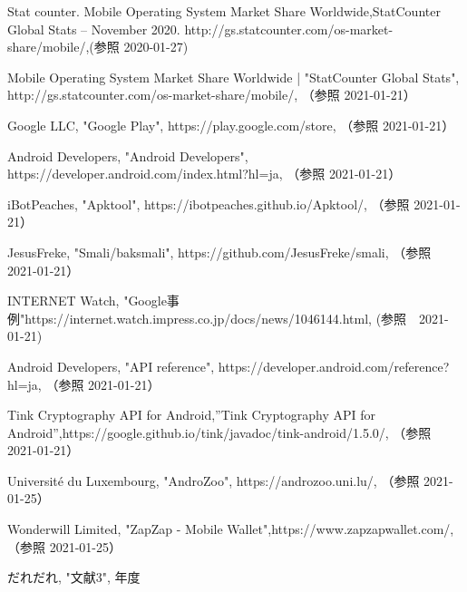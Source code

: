 \newpage
\begin{thebibliography}{99}

Stat counter. Mobile Operating System Market Share Worldwide,StatCounter Global Stats – November 2020. http://gs.statcounter.com/os-market-share/mobile/,(参照 2020-01-27)

Mobile Operating System Market Share Worldwide |  "StatCounter Global Stats",
http://gs.statcounter.com/os-market-share/mobile/, （参照 2021-01-21）

Google LLC, "Google Play", https://play.google.com/store, （参照 2021-01-21）

Android Developers, "Android Developers", https://developer.android.com/index.html?hl=ja, （参照 2021-01-21）

iBotPeaches, "Apktool", https://ibotpeaches.github.io/Apktool/, （参照 2021-01-21）

JesusFreke, "Smali/baksmali", https://github.com/JesusFreke/smali, （参照 2021-01-21）


INTERNET Watch, "Google事例"https://internet.watch.impress.co.jp/docs/news/1046144.html, (参照　2021-01-21)

Android Developers, "API reference", https://developer.android.com/reference?hl=ja, （参照 2021-01-21）

Tink Cryptography API for Android,''Tink Cryptography API for Android'',https://google.github.io/tink/javadoc/tink-android/1.5.0/, （参照 2021-01-21）

Université du Luxembourg, "AndroZoo",  https://androzoo.uni.lu/, （参照 2021-01-25）

Wonderwill Limited, "ZapZap - Mobile Wallet",https://www.zapzapwallet.com/,（参照 2021-01-25）


だれだれ, "文献3", 年度

\end{thebibliography}